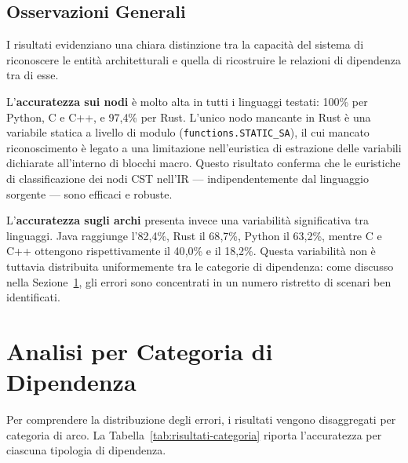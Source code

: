 \subsection{Osservazioni Generali}
I risultati evidenziano una chiara distinzione tra la capacità del
sistema di riconoscere le entità architetturali e quella di ricostruire
le relazioni di dipendenza tra di esse.

L'\textbf{accuratezza sui nodi} è molto alta in tutti i linguaggi
testati: 100\% per Python, C e C++, e 97{,}4\% per Rust. L'unico
nodo mancante in Rust è una variabile statica a livello di modulo
(\texttt{functions.STATIC\_SA}), il cui mancato riconoscimento è
legato a una limitazione nell'euristica di estrazione delle variabili
dichiarate all'interno di blocchi macro. Questo risultato conferma che
le euristiche di classificazione dei nodi CST nell'IR ---
indipendentemente dal linguaggio sorgente --- sono efficaci e robuste.

L'\textbf{accuratezza sugli archi} presenta invece una variabilità
significativa tra linguaggi. Java raggiunge l'82{,}4\%, Rust il
68{,}7\%, Python il 63{,}2\%, mentre C e C++ ottengono
rispettivamente il 40{,}0\% e il 18{,}2\%. Questa variabilità non è
tuttavia distribuita uniformemente tra le categorie di dipendenza: come
discusso nella Sezione~\ref{sec:analisi-errori}, gli errori sono
concentrati in un numero ristretto di scenari ben identificati.

\section{Analisi per Categoria di Dipendenza}
\label{sec:analisi-errori}
Per comprendere la distribuzione degli errori, i risultati vengono
disaggregati per categoria di arco. La
Tabella~\ref{tab:risultati-categoria} riporta l'accuratezza per
ciascuna tipologia di dipendenza.


